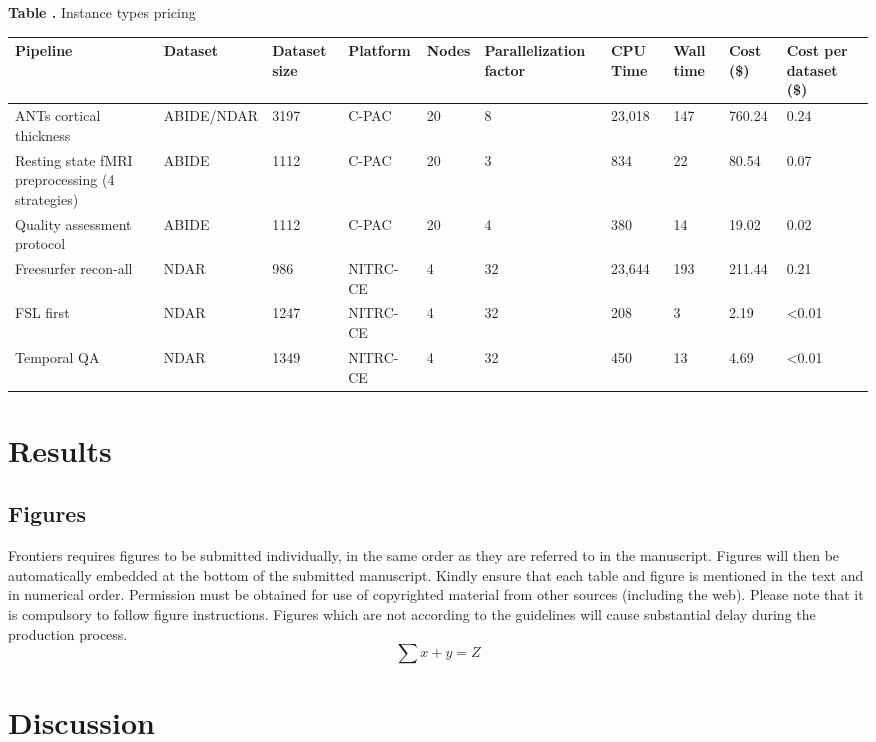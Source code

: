 \documentclass{frontiersSCNS} %
\begin{document}
\begin{table}[!t]
\textbf{\label{Tab:01} Table .}{ Instance types pricing}

\processtable{}
{\begin{tabular}{llllllllll}\toprule
        Pipeline & Dataset & Dataset size & Platform & Nodes & Parallelization factor & CPU Time & Wall time & Cost (\$) & Cost per dataset (\$)\\\midrule
        ANTs cortical thickness & ABIDE/NDAR & 3197 & C-PAC & 20 & 8 & 23,018 & 147 & 760.24 & 0.24\\
        Resting state fMRI preprocessing (4 strategies) & ABIDE & 1112 & C-PAC & 20 & 3 & 834 & 22 & 80.54 & 0.07\\
        Quality assessment protocol & ABIDE & 1112 & C-PAC & 20 & 4 & 380 & 14 & 19.02 & 0.02\\
        Freesurfer recon-all & NDAR & 986 & NITRC-CE & 4 & 32 & 23,644 & 193 & 211.44 & 0.21\\
        FSL first & NDAR & 1247 & NITRC-CE & 4 & 32 & 208 & 3 & 2.19 & <0.01 \\
        Temporal QA & NDAR & 1349 & NITRC-CE & 4 & 32 & 450 & 13 & 4.69 & <0.01
\end{tabular}}{}
\end{table}

\section{Results}

\subsection{Figures}
Frontiers requires figures to be submitted individually, in the same order as they are referred to in the manuscript. Figures will then be automatically embedded at the bottom of the submitted manuscript. Kindly ensure that each table and figure is mentioned in the text and in numerical order. Permission must be obtained for use of copyrighted material from other sources (including the web). Please note that it is compulsory to follow figure instructions. Figures which are not according to the guidelines will cause substantial delay during the production process.
\begin{equation}
\sum x+ y =Z\label{eq:01}
\end{equation}

\section{Discussion}
\end{document}
